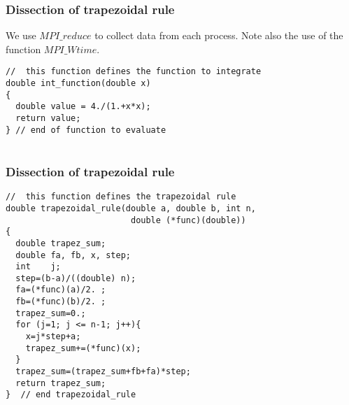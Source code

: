 \documentclass{beamer}
\begin{document}
\begin{frame}
\frametitle{Dissection of trapezoidal rule}

\begin{block}{}

We use $MPI\_reduce$ to collect data from each process. Note also the use of the function 
$MPI\_Wtime$. 








\begin{verbatim}
//  this function defines the function to integrate
double int_function(double x)
{
  double value = 4./(1.+x*x);
  return value;
} // end of function to evaluate


\end{verbatim}


\end{block}
\end{frame}

\begin{frame}
\frametitle{Dissection of trapezoidal rule}

\begin{block}{}



















\begin{verbatim}
//  this function defines the trapezoidal rule
double trapezoidal_rule(double a, double b, int n, 
                         double (*func)(double))
{
  double trapez_sum;
  double fa, fb, x, step;
  int    j;
  step=(b-a)/((double) n);
  fa=(*func)(a)/2. ;
  fb=(*func)(b)/2. ;
  trapez_sum=0.;
  for (j=1; j <= n-1; j++){
    x=j*step+a;
    trapez_sum+=(*func)(x);
  }
  trapez_sum=(trapez_sum+fb+fa)*step;
  return trapez_sum;
}  // end trapezoidal_rule 

\end{verbatim}


\end{block}
\end{frame}
\end{document}
